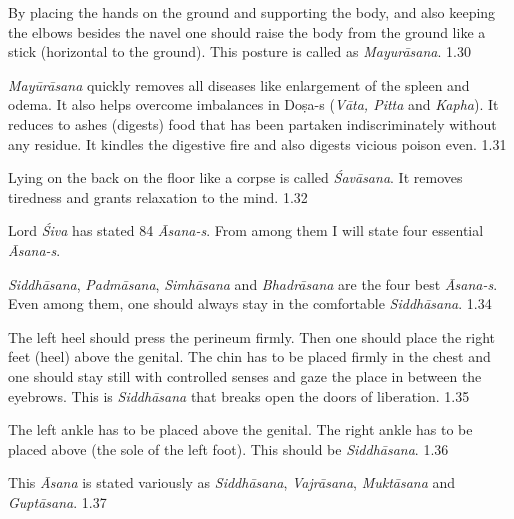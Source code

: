 
By placing the hands on the ground and supporting the body, and also keeping the elbows besides the navel one should raise the body from the ground like a stick (horizontal to the ground). This posture is called as \textit{Mayurāsana}.  1.30

\newpage
{}

\textit{Mayūrāsana} quickly removes all diseases like enlargement of the spleen and odema. It also helps overcome imbalances in Doṣa-s (\textit{Vāta, Pitta} and \textit{Kapha}). It reduces to ashes (digests) food that has been partaken indiscriminately without any residue. It kindles the digestive fire and also digests vicious poison even. 1.31



Lying on the back on the floor like a corpse is called \textit{Śavāsana}. It removes tiredness and grants relaxation to the mind. 1.32


Lord \textit{Śiva} has stated 84 \textit{Āsana-s}. From among them I will state four essential \textit{Āsana-s}.


\textit{Siddhāsana}, \textit{Padmāsana}, \textit{Simhāsana} and \textit{Bhadrāsana} are the four best \textit{Āsana-s}. Even among them, one should always stay in the comfortable \textit{Siddhāsana}.  1.34


The left heel should press the perineum firmly. Then one should place the right feet (heel) above the genital.  The chin has to be placed firmly in the chest and one should stay still with controlled senses and gaze the place in between the eyebrows. This is \textit{Siddhāsana} that breaks open the doors of liberation.  1.35


The left ankle has to be placed above the genital. The right ankle has to be placed above (the sole of the left foot). This should be \textit{Siddhāsana}. 1.36


This \textit{Āsana} is stated variously as \textit{Siddhāsana}, \textit{Vajrāsana}, \textit{Muktāsana} and \textit{Guptāsana}. 1.37

